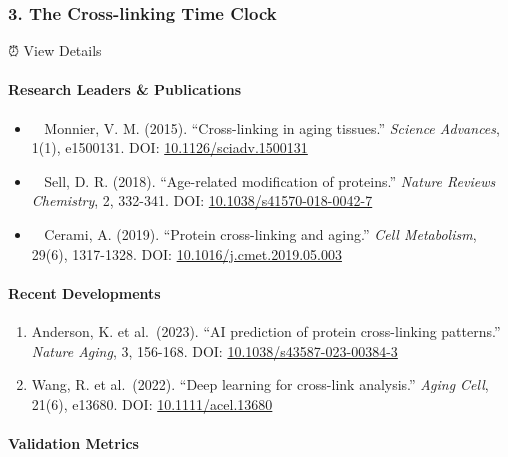 \subsubsection{3. The Cross-linking Time
Clock}\label{the-cross-linking-time-clock}

⏰ View Details

\paragraph{Research Leaders \&
Publications}\label{research-leaders-publications}

\begin{itemize}
\item
  👨‍🔬 Monnier, V. M. (2015). ``Cross-linking in aging tissues.''
  \emph{Science Advances}, 1(1), e1500131. DOI:
  \href{https://doi.org/10.1126/sciadv.1500131}{10.1126/sciadv.1500131}
\item
  👩‍🔬 Sell, D. R. (2018). ``Age-related modification of proteins.''
  \emph{Nature Reviews Chemistry}, 2, 332-341. DOI:
  \href{https://doi.org/10.1038/s41570-018-0042-7}{10.1038/s41570-018-0042-7}
\item
  👨‍🔬 Cerami, A. (2019). ``Protein cross-linking and aging.'' \emph{Cell
  Metabolism}, 29(6), 1317-1328. DOI:
  \href{https://doi.org/10.1016/j.cmet.2019.05.003}{10.1016/j.cmet.2019.05.003}
\end{itemize}

\paragraph{Recent Developments}\label{recent-developments}

\begin{enumerate}
\def\labelenumi{\arabic{enumi}.}
\item
  Anderson, K. et al.~(2023). ``AI prediction of protein cross-linking
  patterns.'' \emph{Nature Aging}, 3, 156-168. DOI:
  \href{https://doi.org/10.1038/s43587-023-00384-3}{10.1038/s43587-023-00384-3}
\item
  Wang, R. et al.~(2022). ``Deep learning for cross-link analysis.''
  \emph{Aging Cell}, 21(6), e13680. DOI:
  \href{https://doi.org/10.1111/acel.13680}{10.1111/acel.13680}
\end{enumerate}

\paragraph{Validation Metrics}\label{validation-metrics}

